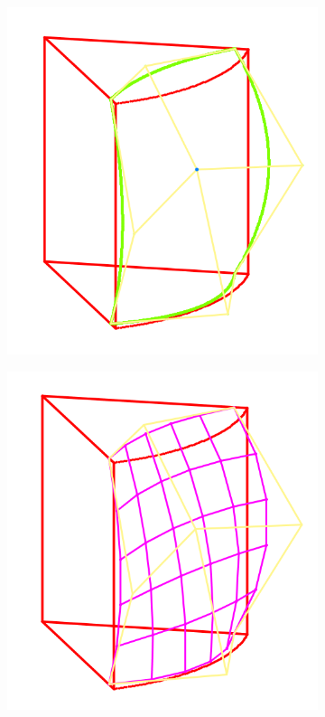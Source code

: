 \documentclass{Humantech_Paper_Awardfullpaper_hutech}
\begin{document}
\begin{figure}[h]
	\begin{center}
		\begin{subfigure}{.2\textwidth}
			\includegraphics[width=\textwidth]{approx3}
		\end{subfigure}
		\begin{subfigure}{.2\textwidth}
			\includegraphics[width=\textwidth]{approx4}

\end{subfigure}
\end{center}
\end{figure}
\end{document}
